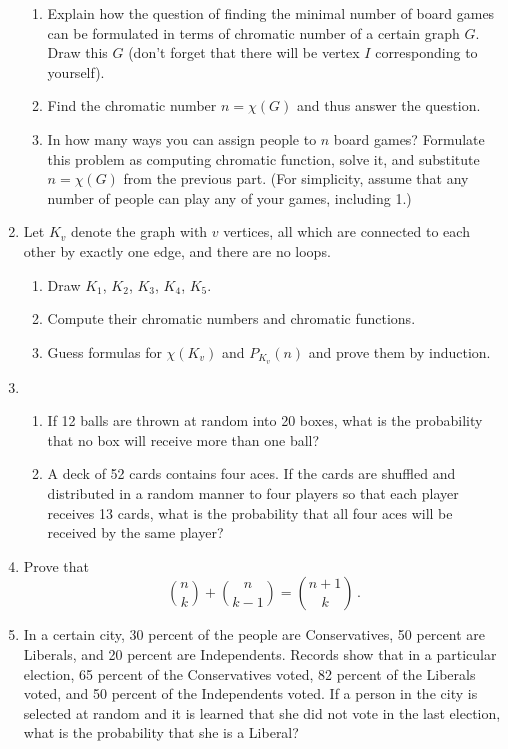 \documentclass[12pt]{amsart}
\begin{document}
\begin{enumerate}[label=\arabic*.,itemsep=10pt, leftmargin=*]
    \begin{enumerate}[label=\alph*.,itemsep=5pt, leftmargin=*]
    \item Explain how the question of finding the minimal number of board games can be formulated in terms of chromatic number of a certain graph $G$. Draw this $G$ (don't forget that there will be vertex $I$ corresponding to yourself).
    \item Find the chromatic number $n = \chi(G)$ and thus answer the question.
    \item In how many ways you can assign people to $n$ board games? Formulate this problem as computing chromatic function, solve it, and substitute $n=\chi(G)$ from the previous part. (For simplicity, assume that any number of people can play any of your games, including 1.)
    \end{enumerate}




\item  Let $K_v$ denote the graph with $v$ vertices, all which are connected to each other by exactly one edge, and there are no loops.
    \begin{enumerate}[label=\alph*.,itemsep=5pt, leftmargin=*]
    \item Draw $K_1$, $K_2$, $K_3$, $K_4$, $K_5$.
    \item Compute their chromatic numbers and chromatic functions.
    \item Guess formulas for $\chi(K_v)$ and $P_{K_v}(n)$ and prove them by induction.
\end{enumerate}



\item  
\begin{enumerate}
    \item 
        If 12 balls are thrown at random into 20 boxes, what is the probability that no box will receive more than one ball?
    \item 
    A deck of 52 cards contains four aces. If the cards are shuffled and distributed in a random manner to four players so that each player receives 13 cards, what is the probability that all four aces will be received by the same player?
\end{enumerate}

\item Prove that
\begin{equation*}
    \binom{n}{k} + \binom{n}{k-1} = \binom{n+1}{k}\,.
\end{equation*}


\item 
In a certain city, 30 percent of the people are Conservatives, 50 percent are Liberals, and 20 percent are Independents. Records show that in a particular election, 65 percent of the Conservatives voted, 82 percent of the Liberals voted, and 50 percent of the Independents voted. If a person in the city is selected at random and it is learned that she did not vote in the last election, what is the probability that she is a Liberal?

\end{enumerate}
\end{document}
